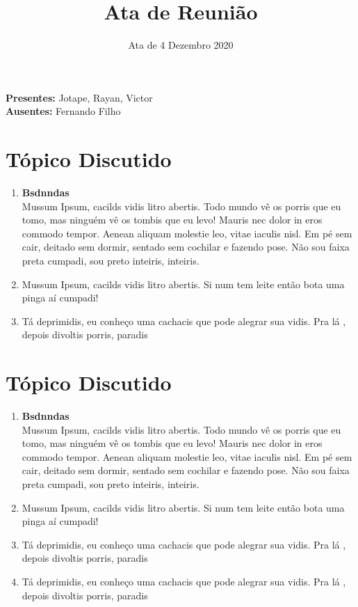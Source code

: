 \documentclass[12pt, letterpaper]{article}
\begin{document}
\title{\vspace{-2.0cm}\textbf{Ata de Reunião}}
\date{\vspace{-1.3cm}Ata de 4 Dezembro 2020}
\maketitle


\textbf{Presentes:} Jotape, Rayan, Victor \\

\textbf{Ausentes:} Fernando Filho \\

\section*{Tópico Discutido}

  \begin{enumerate}[\indent {}]
      \item \textbf{Bsdnndas} \\ Mussum Ipsum, cacilds vidis litro abertis. Todo mundo vê os porris que eu tomo, mas ninguém vê os tombis que eu levo! Mauris nec dolor in eros commodo tempor. Aenean aliquam molestie leo, vitae iaculis nisl. Em pé sem cair, deitado sem dormir, sentado sem cochilar e fazendo pose. Não sou faixa preta cumpadi, sou preto inteiris, inteiris.
    \item Mussum Ipsum, cacilds vidis litro abertis. Si num tem leite então bota uma pinga aí cumpadi!
    \item Tá deprimidis, eu conheço uma cachacis que pode alegrar sua vidis. Pra lá , depois divoltis porris, paradis
  \end{enumerate}

\section*{Tópico Discutido}

  \begin{enumerate}[\indent {}]
      \item \textbf{Bsdnndas} \\ Mussum Ipsum, cacilds vidis litro abertis. Todo mundo vê os porris que eu tomo, mas ninguém vê os tombis que eu levo! Mauris nec dolor in eros commodo tempor. Aenean aliquam molestie leo, vitae iaculis nisl. Em pé sem cair, deitado sem dormir, sentado sem cochilar e fazendo pose. Não sou faixa preta cumpadi, sou preto inteiris, inteiris.
    \item Mussum Ipsum, cacilds vidis litro abertis. Si num tem leite então bota uma pinga aí cumpadi!
    \item Tá deprimidis, eu conheço uma cachacis que pode alegrar sua vidis. Pra lá , depois divoltis porris, paradis
    \item Tá deprimidis, eu conheço uma cachacis que pode alegrar sua vidis. Pra lá , depois divoltis porris, paradis
  \end{enumerate}
\end{document}
